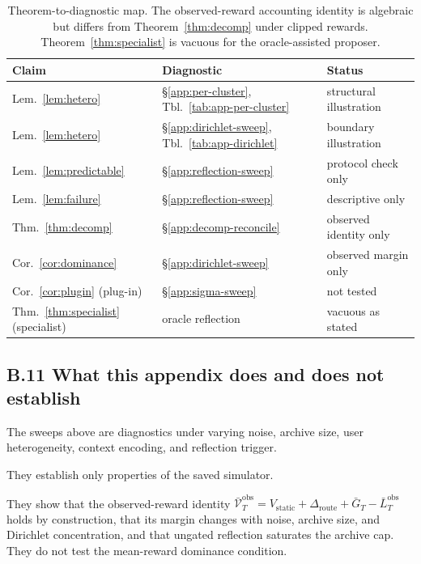 \documentclass{article} %
\begin{document}
\begin{table}[h]
\centering
\small
\begin{tabular}{lll}
\toprule
Claim & Diagnostic & Status \\
\midrule
Lem.~\ref{lem:hetero} & \S\ref{app:per-cluster}, Tbl.~\ref{tab:app-per-cluster} & structural illustration \\
Lem.~\ref{lem:hetero} & \S\ref{app:dirichlet-sweep}, Tbl.~\ref{tab:app-dirichlet} & boundary illustration \\
Lem.~\ref{lem:predictable} & \S\ref{app:reflection-sweep} & protocol check only \\
Lem.~\ref{lem:failure} & \S\ref{app:reflection-sweep} & descriptive only \\
Thm.~\ref{thm:decomp} & \S\ref{app:decomp-reconcile} & observed identity only \\
Cor.~\ref{cor:dominance} & \S\ref{app:dirichlet-sweep} & observed margin only \\
Cor.~\ref{cor:plugin} (plug-in) & \S\ref{app:sigma-sweep} & not tested \\
Thm.~\ref{thm:specialist} (specialist) & oracle reflection & vacuous as stated \\
\bottomrule
\end{tabular}
\caption{Theorem-to-diagnostic map. The observed-reward accounting identity is
algebraic but differs from Theorem~\ref{thm:decomp} under clipped rewards.
Theorem~\ref{thm:specialist} is vacuous for the oracle-assisted proposer.}
\label{tab:app-coverage-sweeps}
\end{table}

\subsection{B.11 What this appendix does and does not establish}

\label{app:what-not}

The sweeps above are diagnostics under varying noise, archive size, user
heterogeneity, context encoding, and reflection trigger.

They establish only properties of the saved simulator.

They show that the observed-reward identity
\(\bar{\mathcal V}_T^{\mathrm{obs}}
=V_{\mathrm{static}}+\Delta_{\mathrm{route}}+\bar G_T
-\bar L_T^{\mathrm{obs}}\) holds by construction, that its margin changes with
noise, archive size, and Dirichlet concentration, and that ungated reflection
saturates the archive cap. They do not test the mean-reward dominance
condition.
\end{document}

